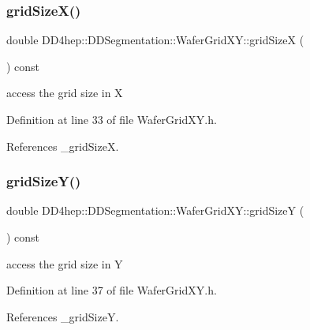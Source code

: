 \subsubsection{\texorpdfstring{grid\+Size\+X()}{gridSizeX()}}
{\footnotesize\ttfamily double D\+D4hep\+::\+D\+D\+Segmentation\+::\+Wafer\+Grid\+X\+Y\+::grid\+SizeX (\begin{DoxyParamCaption}{ }\end{DoxyParamCaption}) const\hspace{0.3cm}{\ttfamily [inline]}}



access the grid size in X 



Definition at line 33 of file Wafer\+Grid\+X\+Y.\+h.



References \+\_\+grid\+SizeX.

\hypertarget{class_d_d4hep_1_1_d_d_segmentation_1_1_wafer_grid_x_y_aae5093c08586a5627d282a2d1bbf99c7}{}\label{class_d_d4hep_1_1_d_d_segmentation_1_1_wafer_grid_x_y_aae5093c08586a5627d282a2d1bbf99c7} 
\subsubsection{\texorpdfstring{grid\+Size\+Y()}{gridSizeY()}}
{\footnotesize\ttfamily double D\+D4hep\+::\+D\+D\+Segmentation\+::\+Wafer\+Grid\+X\+Y\+::grid\+SizeY (\begin{DoxyParamCaption}{ }\end{DoxyParamCaption}) const\hspace{0.3cm}{\ttfamily [inline]}}



access the grid size in Y 



Definition at line 37 of file Wafer\+Grid\+X\+Y.\+h.



References \+\_\+grid\+SizeY.

\hypertarget{class_d_d4hep_1_1_d_d_segmentation_1_1_wafer_grid_x_y_a682652a672947e3ddbd1131ade5c79aa}{}\label{class_d_d4hep_1_1_d_d_segmentation_1_1_wafer_grid_x_y_a682652a672947e3ddbd1131ade5c79aa} 
